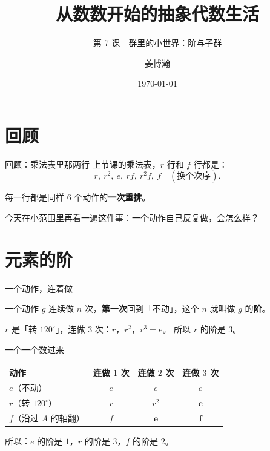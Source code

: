 \documentclass[10pt]{beamer}
\title{从数数开始的抽象代数生活}
\subtitle{第 7 课　群里的小世界：阶与子群}
\author{姜博瀚}
\institute{厦门大学附属实验中学}
\date{\today}
\begin{document}
\begin{frame}
  \titlepage
\end{frame}

\section{回顾}

\begin{frame}{回顾：乘法表里那两行}
  上节课的乘法表，\(r\) 行和 \(f\) 行都是：
  \[
    r,\ r^2,\ e,\ rf,\ r^2f,\ f \quad(\text{换个次序}) .
  \]
  \pause
  \begin{center}
    每一行都是同样 \(6\) 个动作的\textbf{一次重排}。
  \end{center}
  \pause
  \begin{center}
    今天在小范围里再看一遍这件事：一个动作自己反复做，会怎么样？
  \end{center}
\end{frame}

\section{元素的阶}

\begin{frame}{一个动作，连着做}
  \begin{definition}[元素的阶]
    一个动作 \(g\) 连续做 \(n\) 次，\textbf{第一次}回到「不动」，这个 \(n\)
    就叫做 \(g\) 的\textbf{阶}。
  \end{definition}
  \pause
  \begin{example}
    \(r\) 是「转 \(120^\circ\)」，连做 \(3\) 次：\(r\)，\(r^2\)，\(r^3=e\)。
    所以 \(r\) 的阶是 \(3\)。
  \end{example}
\end{frame}

\begin{frame}{一个一个数过来}
  \begin{center}
  \begin{tabular}{@{}lccc@{}}
    \toprule
    动作 & 连做 \(1\) 次 & 连做 \(2\) 次 & 连做 \(3\) 次 \\
    \midrule
    \(e\)（不动） & \(e\) & \(e\) & \(e\) \\
    \(r\)（转 \(120^\circ\)） & \(r\) & \(r^2\) & \(\mathbf{e}\) \\
    \(f\)（沿过 \(A\) 的轴翻） & \(f\) & \(\mathbf{e}\) & \(\mathbf{f}\) \\
    \bottomrule
  \end{tabular}
  \end{center}
  \pause
  \begin{center}
    {\large 所以：\(e\) 的阶是 \(1\)，\(r\) 的阶是 \(3\)，\(f\) 的阶是 \(2\)。}
  \end{center}
\end{frame}
\end{document}
